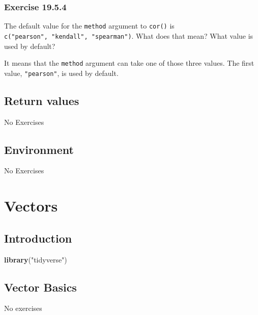 \documentclass[]{book}
\newenvironment{Shaded}{\begin{snugshade}}{\end{snugshade}}
\newcommand{\KeywordTok}[1]{\textcolor[rgb]{0.13,0.29,0.53}{\textbf{#1}}}
\newcommand{\NormalTok}[1]{#1}
\newcommand{\StringTok}[1]{\textcolor[rgb]{0.31,0.60,0.02}{#1}}
\theoremstyle{plain}
\theoremstyle{remark}
\theoremstyle{definition}
\theoremstyle{definition}
\theoremstyle{definition}
\theoremstyle{remark}
\begin{document}
\hypertarget{exercise-19.5.4}{%
\subsection*{\texorpdfstring{Exercise
{19.5.4}}{Exercise 19.5.4}}\label{exercise-19.5.4}}

The default value for the \texttt{method} argument to \texttt{cor()} is
\texttt{c("pearson",\ "kendall",\ "spearman")}. What does that mean?
What value is used by default?

It means that the \texttt{method} argument can take one of those three
values. The first value, \texttt{"pearson"}, is used by default.

\hypertarget{return-values}{%
\section{Return values}\label{return-values}}

No Exercises

\hypertarget{environment}{%
\section{Environment}\label{environment}}

No Exercises

\hypertarget{vectors}{%
\chapter{Vectors}\label{vectors}}

\hypertarget{introduction-13}{%
\section{Introduction}\label{introduction-13}}

\begin{Shaded}
\begin{Highlighting}[]
\KeywordTok{library}\NormalTok{(}\StringTok{"tidyverse"}\NormalTok{)}
\end{Highlighting}
\end{Shaded}

\hypertarget{vector-basics}{%
\section{Vector Basics}\label{vector-basics}}

No exercises
\end{document}
